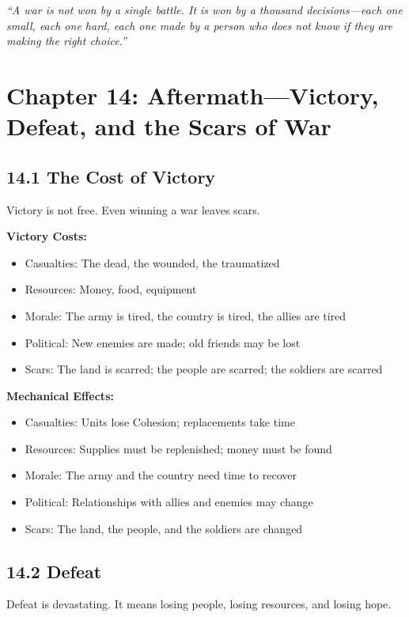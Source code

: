 \documentclass[11pt]{article}
\begin{document}
\textit{``A war is not won by a single battle. It is won by a thousand decisions—each one small, each one hard, each one made by a person who does not know if they are making the right choice.''}

\section{Chapter 14: Aftermath—Victory, Defeat, and the Scars of War}

\subsection{14.1 The Cost of Victory}

Victory is not free. Even winning a war leaves scars.

\textbf{Victory Costs:}
\begin{itemize}
  \item Casualties: The dead, the wounded, the traumatized
  \item Resources: Money, food, equipment
  \item Morale: The army is tired, the country is tired, the allies are tired
  \item Political: New enemies are made; old friends may be lost
  \item Scars: The land is scarred; the people are scarred; the soldiers are scarred
\end{itemize}

\textbf{Mechanical Effects:}
\begin{itemize}
  \item Casualties: Units lose Cohesion; replacements take time
  \item Resources: Supplies must be replenished; money must be found
  \item Morale: The army and the country need time to recover
  \item Political: Relationships with allies and enemies may change
  \item Scars: The land, the people, and the soldiers are changed
\end{itemize}

\subsection{14.2 Defeat}

Defeat is devastating. It means losing people, losing resources, and losing hope.
\end{document}
